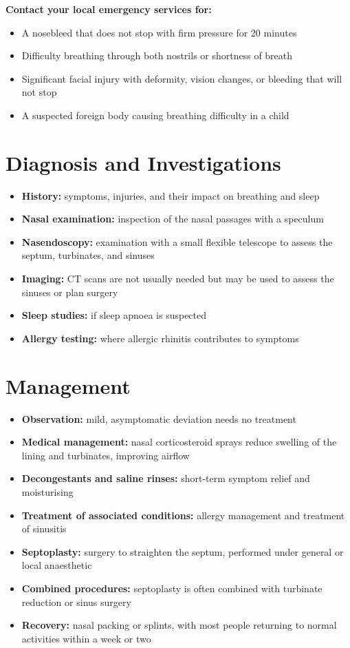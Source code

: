 \textbf{Contact your local emergency services for:}
\begin{itemize}
    \item A nosebleed that does not stop with firm pressure for 20 minutes
    \item Difficulty breathing through both nostrils or shortness of breath
    \item Significant facial injury with deformity, vision changes, or bleeding that will not stop
    \item A suspected foreign body causing breathing difficulty in a child
\end{itemize}

\section*{Diagnosis and Investigations}
\begin{itemize}
    \item \textbf{History:} symptoms, injuries, and their impact on breathing and sleep
    \item \textbf{Nasal examination:} inspection of the nasal passages with a speculum
    \item \textbf{Nasendoscopy:} examination with a small flexible telescope to assess the septum, turbinates, and sinuses
    \item \textbf{Imaging:} CT scans are not usually needed but may be used to assess the sinuses or plan surgery
    \item \textbf{Sleep studies:} if sleep apnoea is suspected
    \item \textbf{Allergy testing:} where allergic rhinitis contributes to symptoms
\end{itemize}

\section*{Management}
\begin{itemize}
    \item \textbf{Observation:} mild, asymptomatic deviation needs no treatment
    \item \textbf{Medical management:} nasal corticosteroid sprays reduce swelling of the lining and turbinates, improving airflow
    \item \textbf{Decongestants and saline rinses:} short-term symptom relief and moisturising
    \item \textbf{Treatment of associated conditions:} allergy management and treatment of sinusitis
    \item \textbf{Septoplasty:} surgery to straighten the septum, performed under general or local anaesthetic
    \item \textbf{Combined procedures:} septoplasty is often combined with turbinate reduction or sinus surgery
    \item \textbf{Recovery:} nasal packing or splints, with most people returning to normal activities within a week or two
\end{itemize}

